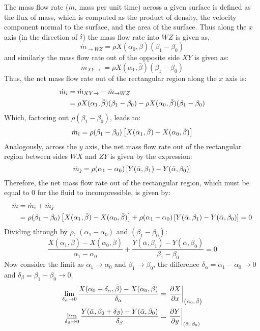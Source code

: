 The mass flow rate ($\dot{m}$, mass per unit time) across a given surface is defined as the flux of mass, which is computed as the product of density, the velocity component normal to the
surface, and the area of the surface. Thus along the $x$ axis (in the direction of $\hat{\imath}$) the mass flow rate into $WZ$ is given as,
$$
    \dot{m}_{\rightarrow WZ}=\rho X(\alpha_0,\bar{\beta})(\beta_1-\beta_0)
$$
and similarly the mass flow rate out of the opposite side $XY$ is given as:
$$
    \dot{m}_{XY\rightarrow}=\rho X(\alpha_1,\bar{\beta})(\beta_1-\beta_0)
$$
Thus, the net mass flow rate out of the rectangular region along the $x$ axis is:
\begin{align*}
    \dot{m}_{\hat{\imath}}&=\dot{m}_{XY\rightarrow}-\dot{m}_{\rightarrow WZ}\\
    &=\rho X(\alpha_1,\bar{\beta})(\beta_1-\beta_0)-\rho X(\alpha_0,\bar{\beta})(\beta_1-\beta_0)
\end{align*}
Which, factoring out $\rho(\beta_1-\beta_0)$, leads to:
$$
    \dot{m}_{\hat{\imath}}=\rho(\beta_1-\beta_0)\left[X(\alpha_1,\bar{\beta})-X(\alpha_0,\bar{\beta})\right]
$$
Analogously, across the $y$ axis, the net mass flow rate out of the rectangular region between sides $WX$ and $ZY$ is given by the expression:
$$
    \dot{m}_{\hat{\jmath}}=\rho(\alpha_1-\alpha_0)\left[Y(\bar{\alpha},\beta_1)-Y(\bar{\alpha},\beta_0)\right]
$$
Therefore, the net mass flow rate out of the rectangular region, which must be equal to 0 for the fluid to incompressible, is given by:
\begin{align*}
    \dot{m}&=\dot{m}_{\hat{\imath}}+\dot{m}_{\hat{\jmath}}\\
    &=\rho(\beta_1-\beta_0)\left[X(\alpha_1,\bar{\beta})-X(\alpha_0,\bar{\beta})\right]+\rho(\alpha_1-\alpha_0)\left[Y(\bar{\alpha},\beta_1)-Y(\bar{\alpha},\beta_0)\right]=0
\end{align*}
Dividing through by $\rho$, $(\alpha_1-\alpha_0)$ and $(\beta_1-\beta_0)$:
$$
    \frac{X(\alpha_1,\bar{\beta})-X(\alpha_0,\bar{\beta})}{\alpha_1-\alpha_0}+\frac{Y(\bar{\alpha},\beta_1)-Y(\bar{\alpha},\beta_0)}{\beta_1-\beta_0}=0
$$
Now consider the limit as $\alpha_1\rightarrow\alpha_0$ and $\beta_1\rightarrow\beta_0$, the difference $\delta_\alpha=\alpha_1-\alpha_0\rightarrow0$ and $\delta_\beta=\beta_1-\beta_0\rightarrow0$.
\begin{align*}
    \lim_{\delta_\alpha\rightarrow0}\frac{X(\alpha_0+\delta_\alpha,\bar{\beta})-X(\alpha_0,\bar{\beta})}{\delta_\alpha}&=\eval{\pdv{X}{x}}_{\point{\alpha_0}{\bar{\beta}}}\\
    \lim_{\delta_\beta\rightarrow0}\frac{Y(\bar{\alpha},\beta_0+\delta_\beta)-Y(\bar{\alpha},\beta_0)}{\delta_\beta}&=\eval{\pdv{Y}{y}}_{\point{\bar{\alpha}}{\beta_0}}
\end{align*}

